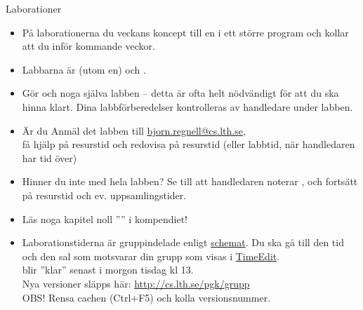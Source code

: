 \begin{SlideExtra}{Laborationer}\SlideFontSmall
\begin{itemize}
\item På laborationerna  du veckans koncept till en  i ett större program och kollar att du  inför kommande veckor.
\item Labbarna är  (utom en) och .

\item Gör  och  noga  själva labben -- detta är ofta helt nödvändigt för att du ska hinna klart. Dina labbförberedelser kontrolleras av handledare under labben.

\item Är du  Anmäl det  labben till \url{bjorn.regnell@cs.lth.se}, \\ få hjälp på resurstid och redovisa på resurstid (eller labbtid, när handledaren har tid över)

\item Hinner du inte med hela labben? Se till att handledaren noterar , och fortsätt på resurstid och ev. uppsamlingstider.

\item Läs noga kapitel noll '''' i kompendiet!

\item Laborationstiderna är gruppindelade enligt \href{http://cs.lth.se/pgk/schema/}{schemat}. Du ska gå till den tid och den sal som motsvarar din grupp som visas i \href{http://cs.lth.se/pgk/schema/timeedit/}{TimeEdit}.\\
 blir ''klar'' senast i morgon tisdag kl 13.
\\Nya versioner släpps här: \url{http://cs.lth.se/pgk/grupp}
\\OBS! Rensa cachen (Ctrl+F5) och kolla versionsnummer.
\end{itemize}
\end{SlideExtra}

